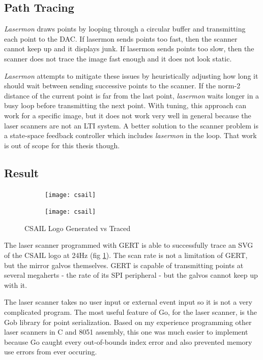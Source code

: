 \subsection{Path Tracing}
\textit{Lasermon} draws points by looping through a circular buffer and transmitting each point to
the DAC. If lasermon sends points too fast, then the scanner cannot keep up and it displays junk. If
lasermon sends points too slow, then the scanner does not trace the image fast enough and it does not
look static.

\textit{Lasermon} attempts to mitigate these issues by heuristically adjusting how long it should wait between
sending successive points to the scanner. If the norm-2 distance of the current point is far from the last
point, \textit{lasermon} waits longer in a busy loop before transmitting the next point. With tuning, this approach can
work for a specific image, but it does not
work very well in general because the laser scanners are not an LTI system. A better solution to the scanner problem
is a state-space feedback controller which includes \textit{lasermon} in the loop. That work is out of scope for
this thesis though.

\subsection{Result}
\begin{figure}[h]
  \begin{subfigure}[t!]{0.5\textwidth}
 \texttt{[image: csail]}
  \end{subfigure}
  \begin{subfigure}[t!]{0.5\textwidth}
 \texttt{[image: csail]}
  \end{subfigure}
  \caption{CSAIL Logo Generated vs Traced} \label{fig:trace_v_reality}
\end{figure}
The laser scanner programmed with GERT is able to successfully trace an SVG of the CSAIL logo
at 24Hz (fig \ref{fig:trace_v_reality}). The scan rate is not a limitation of GERT, but the mirror galvos themselves. GERT is
capable of transmitting points at several megaherts - the rate of its SPI peripheral - but the galvos
cannot keep up with it.

The laser scanner takes no user input or external event input so it is not a very complicated program.
The most useful feature of Go, for the laser scanner, is the Gob library for point serialization.
Based on my experience programming other laser scanners in C and 8051 assembly, this one was much easier to implement because
Go caught every out-of-bounds index error and also prevented memory use errors from ever occuring.


